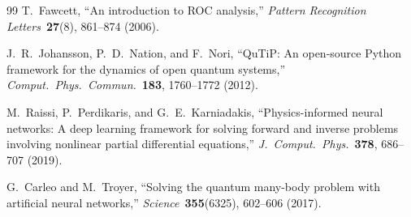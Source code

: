 \documentclass[twocolumn,10pt]{article}
\begin{document}
\begin{thebibliography}{99}
T.~Fawcett,
``An introduction to ROC analysis,''
\textit{Pattern Recognition Letters}\ \textbf{27}(8), 861--874 (2006).

J.~R.~Johansson, P.~D.~Nation, and F.~Nori,
``QuTiP: An open-source Python framework for the dynamics of open
  quantum systems,''
\textit{Comput.\ Phys.\ Commun.}\ \textbf{183}, 1760--1772 (2012).

M.~Raissi, P.~Perdikaris, and G.~E.~Karniadakis,
``Physics-informed neural networks: A deep learning framework for
  solving forward and inverse problems involving nonlinear partial
  differential equations,''
\textit{J.\ Comput.\ Phys.}\ \textbf{378}, 686--707 (2019).

G.~Carleo and M.~Troyer,
``Solving the quantum many-body problem with artificial neural
  networks,''
\textit{Science}\ \textbf{355}(6325), 602--606 (2017).

\end{thebibliography}
\end{document}
